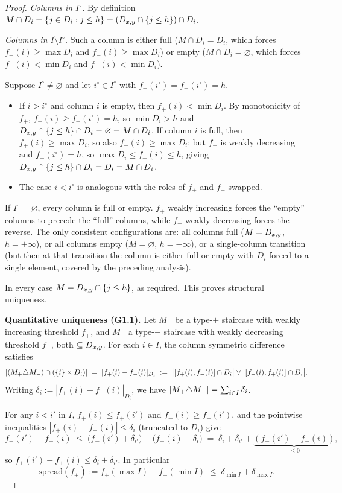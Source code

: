 \begin{proof}
\emph{Columns in $I^{\circ}$.} By definition
$M\cap D_i=\{j\in D_i : j\le h\}=(D_{x,y}\cap\{j\le h\})\cap D_i$.

\emph{Columns in $I\setminus I^{\circ}$.} Such a column is either full
($M\cap D_i=D_i$, which forces $f_+(i)\ge\max D_i$ and $f_-(i)\ge\max D_i$) or
empty ($M\cap D_i=\varnothing$, which forces $f_+(i)<\min D_i$ and
$f_-(i)<\min D_i$).

Suppose $I^{\circ}\ne\varnothing$ and let $i^{\circ}\in I^{\circ}$ with
$f_+(i^{\circ})=f_-(i^{\circ})=h$.
\begin{itemize}[nosep]
  \item If $i>i^{\circ}$ and column $i$ is empty, then $f_+(i)<\min D_i$.
  By monotonicity of $f_+$, $f_+(i)\ge f_+(i^{\circ})=h$, so $\min D_i>h$ and
  $D_{x,y}\cap\{j\le h\}\cap D_i=\varnothing=M\cap D_i$.
  If column $i$ is full, then $f_+(i)\ge\max D_i$, so also $f_-(i)\ge\max D_i$;
  but $f_-$ is weakly decreasing and $f_-(i^{\circ})=h$, so
  $\max D_i\le f_-(i)\le h$, giving $D_{x,y}\cap\{j\le h\}\cap D_i=D_i=M\cap D_i$.
  \item The case $i<i^{\circ}$ is analogous with the roles of $f_+$ and $f_-$
  swapped.
\end{itemize}
If $I^{\circ}=\varnothing$, every column is full or empty. $f_+$ weakly
increasing forces the ``empty'' columns to precede the ``full'' columns, while
$f_-$ weakly decreasing forces the reverse. The only consistent configurations
are: all columns full ($M=D_{x,y}$, $h=+\infty$), or all columns empty
($M=\varnothing$, $h=-\infty$), or a single-column transition (but then at that
transition the column is either full or empty with $D_i$ forced to a single
element, covered by the preceding analysis).

In every case $M=D_{x,y}\cap\{j\le h\}$, as required. This proves structural
uniqueness.

\medskip
\noindent\textbf{Quantitative uniqueness (G1.1).} Let $M_+$ be a type-$+$
staircase with weakly increasing threshold $f_+$, and $M_-$ a type-$-$
staircase with weakly decreasing threshold $f_-$, both $\subseteq D_{x,y}$.
For each $i\in I$, the column symmetric difference satisfies
\[
  |(M_+\triangle M_-)\cap (\{i\}\times D_i)|
    \;=\; |f_+(i)-f_-(i)|_{D_i}
    \;:=\; \bigl|[f_+(i),f_-(i)]\cap D_i\bigr|\vee\bigl|[f_-(i),f_+(i)]\cap D_i\bigr|.
\]
Writing $\delta_i:=|f_+(i)-f_-(i)|_{D_i}$, we have
$|M_+\triangle M_-|=\sum_{i\in I}\delta_i$.

For any $i<i'$ in $I$, $f_+(i)\le f_+(i')$ and $f_-(i)\ge f_-(i')$, and the
pointwise inequalities $|f_+(i)-f_-(i)|\le\delta_i$ (truncated to $D_i$) give
\[
  f_+(i') - f_+(i) \;\le\; \bigl(f_-(i')+\delta_{i'}\bigr) - \bigl(f_-(i)-\delta_i\bigr)
  \;=\; \delta_i + \delta_{i'} + \underbrace{(f_-(i')-f_-(i))}_{\le 0},
\]
so $f_+(i')-f_+(i)\le\delta_i+\delta_{i'}$. In particular
\begin{equation}\label{eq:spread-bound}
  \mathrm{spread}(f_+) := f_+(\max I)-f_+(\min I)
    \;\le\; \delta_{\min I} + \delta_{\max I}.
\end{equation}


\end{proof}
